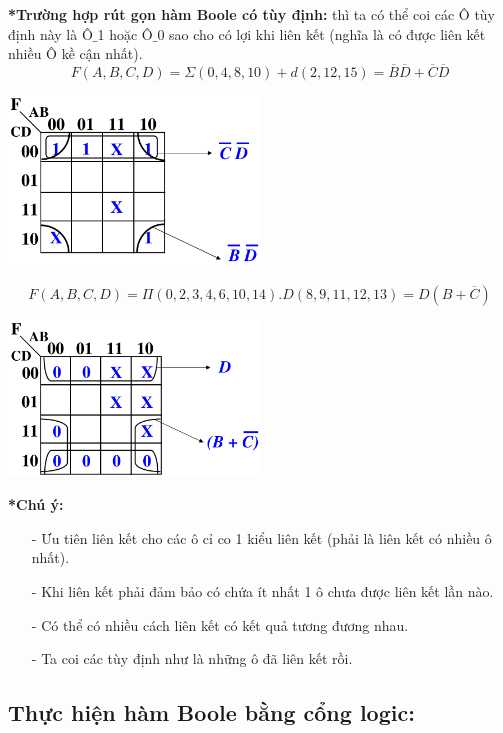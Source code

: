 \textbf{*Trường hợp rút gọn hàm Boole có tùy định:} thì ta có thể coi các Ô tùy định này là Ô$\_$1 hoặc Ô$\_$0 sao cho có lợi khi liên kết (nghĩa là có được liên kết nhiều Ô kề cận nhất).
\[
    F(A,B,C,D) = \varSigma(0,4,8,10) + d(2,12,15) = \overline{B} \overline{D} + \overline{C}\overline{D}
\]
\begin{center}
    \includegraphics[width = 0.5\textwidth]{./local/image/37.png}
\end{center}
\[
    F(A,B,C,D) = \varPi(0,2,3,4,6,10,14) . D(8,9,11,12,13) = D(B + \overline{C})
\]
\begin{center}
    \includegraphics[width = 0.5\textwidth]{./local/image/38.png}
\end{center}
\textbf{*Chú ý:} 
\begin{itemize}
    \item[-] Ưu tiên liên kết cho các ô cỉ co 1 kiểu liên kết (phải là liên kết có nhiều ô nhất).
    \item[-] Khi liên kết phải đảm bảo có chứa ít nhất 1 ô chưa được liên kết lần nào.
    \item[-] Có thể có nhiều cách liên kết có kết quả tương đương nhau.
    \item[-] Ta coi các tùy định như là những ô đã liên kết rồi.
\end{itemize}
\subsection{Thực hiện hàm Boole bằng cổng logic:}
